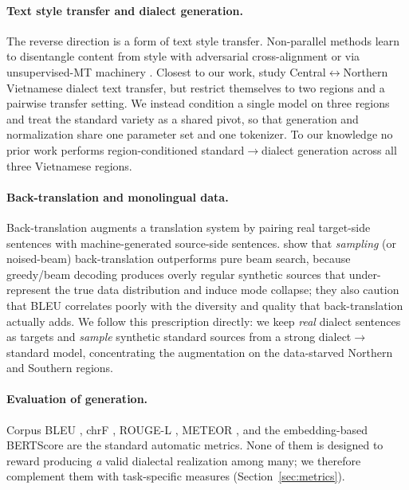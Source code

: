 \documentclass[11pt]{article}
\begin{document}
\paragraph{Text style transfer and dialect generation.}
The reverse direction is a form of text style transfer. Non-parallel methods
learn to disentangle content from style with adversarial cross-alignment
\citep{shen2017style} or via unsupervised-MT machinery
\citep{lample2018unsupervised}. Closest to our work, \citet{le2023vietnamese}
study Central$\leftrightarrow$Northern Vietnamese dialect text transfer, but
restrict themselves to two regions and a pairwise transfer setting. We instead
condition a single model on three regions and treat the standard variety as a
shared pivot, so that generation and normalization share one parameter set and
one tokenizer. To our knowledge no prior work performs region-conditioned
standard$\rightarrow$dialect generation across all three Vietnamese regions.

\paragraph{Back-translation and monolingual data.}
Back-translation \citep{sennrich2016improving} augments a translation system by
pairing real target-side sentences with machine-generated source-side
sentences. \citet{edunov2018understanding} show that \emph{sampling} (or
noised-beam) back-translation outperforms pure beam search, because greedy/beam
decoding produces overly regular synthetic sources that under-represent the true
data distribution and induce mode collapse; they also caution that BLEU
correlates poorly with the diversity and quality that back-translation actually
adds. We follow this prescription directly: we keep \emph{real} dialect
sentences as targets and \emph{sample} synthetic standard sources from a strong
dialect$\rightarrow$standard model, concentrating the augmentation on the
data-starved Northern and Southern regions.

\paragraph{Evaluation of generation.}
Corpus BLEU \citep{papineni2002bleu,post2018sacrebleu}, chrF
\citep{popovic2015chrf}, ROUGE-L \citep{lin2004rouge}, METEOR
\citep{banerjee2005meteor}, and the embedding-based BERTScore
\citep{zhang2020bertscore} are the standard automatic metrics. None of them is
designed to reward producing \emph{a} valid dialectal realization among many; we
therefore complement them with task-specific measures (Section~\ref{sec:metrics}).
\end{document}
